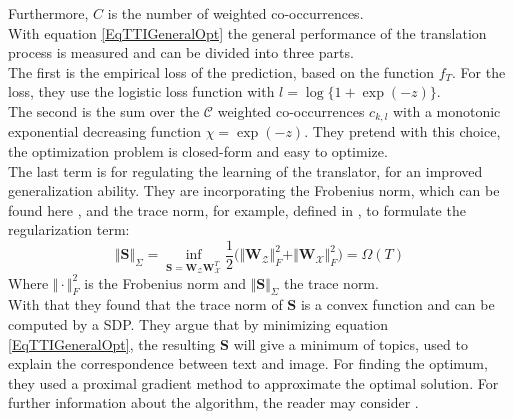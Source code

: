 Furthermore, $C$ is the number of weighted co-occurrences.\\
With equation \eqref{EqTTIGeneralOpt} the general performance of the translation process is measured and can be divided into three parts.\cite{Qi.2011}\\
The first is the empirical loss of the prediction, based on the function $f_T$.
For the loss, they use the logistic loss function with $l = \log\{1+\exp(-z) \}$.\\
The second is the sum over the $\mathcal{C}$ weighted co-occurrences $c_{k,l}$ with a monotonic exponential decreasing function $\chi = \exp(-z)$.
They pretend with this choice, the optimization problem is closed-form and easy to optimize.\\
The last term is for regulating the learning of the translator, for an improved generalization ability.
They are incorporating the Frobenius norm, which can be found here \cite{Ma.1994}, and the trace norm, for example, defined in \cite{Rennie.2005}, to formulate the regularization term:\cite{Qi.2011}
\begin{equation}\label{EqTTITrace}
\Vert \mathbf{S}\Vert_\Sigma = \inf_{\mathbf{S} = \mathbf{W}_\mathcal{Z} \mathbf{W}_\mathcal{X}^T} \frac{1}{2}\bigg(\Vert\mathbf{W}_\mathcal{Z}\Vert_F^2 + \Vert\mathbf{W}_\mathcal{X}\Vert_F^2 \bigg) = \Omega(T)
\end{equation}
Where $\Vert \cdot \Vert_F^2$ is the Frobenius norm and $\Vert \mathbf{S}\Vert_\Sigma$ the trace norm.\\
With that they found that the trace norm of $\mathbf{S}$ is a convex function and can be computed by a \acl{SDP}.
They argue that by minimizing equation \eqref{EqTTIGeneralOpt}, the resulting $\mathbf{S}$ will give a minimum of topics, used to explain the correspondence between text and image.
For finding the optimum, they used a proximal gradient method to approximate the optimal solution.
For further information about the algorithm, the reader may consider \cite{Qi.2011}.


